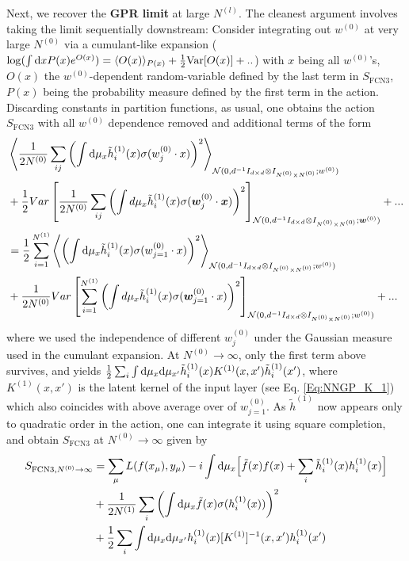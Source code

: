 Next, we recover the {\bf GPR limit} at large $N^{(l)}$. The cleanest argument involves taking the limit sequentially downstream: Consider integrating out $w^{(0)}$ at very large $N^{(0)}$ via a cumulant-like expansion ($\log(\int \text{d} x P(x) e^{O(x)})=\langle O(x) \rangle_{P(x)}+\frac{1}{2} \text{Var}[O(x)]+.. $) with $x$ being all $w^{(0)}$'s, $O(x)$ the $w^{(0)}$-dependent random-variable defined by the last term in $S_{\text{FCN3}}$, $P(x)$ being the probability measure defined by the first term in the action. Discarding constants in partition functions, as usual, one obtains the action $S_{\text{FCN3}}$ with all $w^{(0)}$ dependence removed and additional terms of the form 
\begin{align}
&\left \langle \frac{1}{2N^{(0)}}\sum_{ij}\left( \int \text{d} \mu_x \tilde{h}^{(1)}_i(x) \sigma({w}^{(0)}_{j} \cdot {x})\right)^2 \right \rangle_{{\cal N}(0,d^{-1}I_{d\times d} \otimes I_{N^{(0)}\times N^{(0)}};{w}^{(0)})}  \\ \nonumber 
&+\frac{1}{2}Var\left[ \frac{1}{2N^{(0)}}\sum_{ij}\left( \int d\mu_x \tilde{h}^{(1)}_i(x) \sigma(\bm{w}^{(0)}_{j} \cdot \bm{x})\right)^2 \right]_{{\cal N}(0,d^{-1}I_{d\times d} \otimes I_{N^{(0)}\times N^{(0)}};\bm{w}^{(0)})}+... \\ \nonumber 
&= \frac{1}{2}\sum_{i=1}^{N^{(1)}} \left \langle \left( \int \text{d} \mu_x \tilde{h}^{(1)}_i(x) \sigma({w}^{(0)}_{j=1} \cdot {x})\right)^2 \right \rangle_{{\cal N}(0,d^{-1} I_{d\times d} \otimes I_{N^{(0)}\times N^{(0)}};{w}^{(0)})}  \\ \nonumber 
&+\frac{1}{2 N^{(0)}} Var\left[\sum_{i=1}^{N^{(1)}}\left( \int d\mu_x \tilde{h}^{(1)}_i(x) \sigma(\bm{w}^{(0)}_{j=1} \cdot {x})\right)^2 \right]_{{\cal N}(0,d^{-1}I_{d\times d} \otimes I_{N^{(0)}\times N^{(0)}};{w}^{(0)})}+...
\end{align}
where we used the independence of different ${w}^{(0)}_j$ under the Gaussian measure used in the cumulant expansion. At $N^{(0)}\rightarrow \infty$, only the first term above survives, and yields $\frac{1}{2}\sum_i \int \text{d}\mu_x \text{d}\mu_{x'} \tilde{h}_i^{(1)}(x) K^{(1)}(x,x') \tilde{h}_i^{(1)}(x')$, where $K^{(1)}(x,x')$ is the latent kernel of the input layer (see  Eq. \ref{Eq:NNGP_K_1}) which also coincides with above average over of $w^{(0)}_{j=1}$. As $\tilde{h}^{(1)}$ now appears only to quadratic order in the action, one can integrate it using square completion, and obtain $S_{\text{FCN3}}$ at $N^{(0)}\rightarrow \infty$ given by  
\begin{align}
S_{\text{FCN3},N^{(0)}\rightarrow \infty} &= \sum_{\mu} L(f(x_{\mu}),y_{\mu}) - i\int \text{d}\mu_x \Big[\tilde{f}(x) f(x)+\sum_i
\tilde{h}^{(1)}_i(x) h^{(1)}_i(x)\Big] \\ \nonumber 
&+\frac{1}{2N^{(1)}} \sum_i \left(\int \text{d}\mu_x \tilde{f}(x) \sigma(h^{(1)}_i(x))\right)^2 \\ \nonumber &+ \frac{1}{2}\sum_i \int \text{d} \mu_x \text{d} \mu_{x'} h_i^{(1)}(x) [K^{(1)}]^{-1}(x,x') h_i^{(1)}(x')
\end{align}
